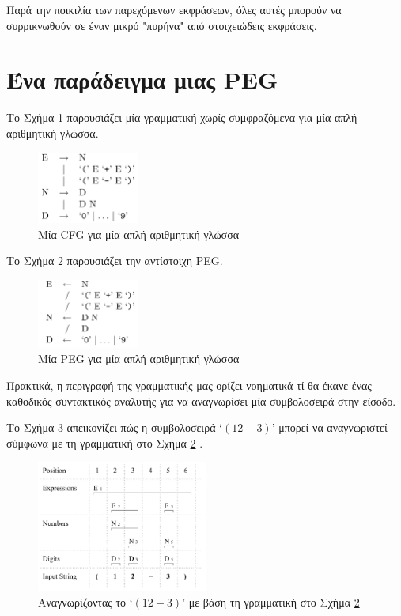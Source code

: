 \documentclass[diploma]{softlab-thesis}
\begin{document}
Παρά την ποικιλία των παρεχόμενων εκφράσεων, όλες αυτές μπορούν να συρρικνωθούν σε έναν μικρό "πυρήνα" από στοιχειώδεις εκφράσεις.

\section{Ένα παράδειγμα μιας PEG}

Το Σχήμα \ref{fig:cfg_example} παρουσιάζει μία γραμματική χωρίς συμφραζόμενα για μία απλή αριθμητική γλώσσα. 

\begin{figure}[h]
    \centering
    \includegraphics[width=0.3\textwidth]{pics/cfg_example}
    \caption{Μία CFG για μία απλή αριθμητική γλώσσα}
    \label{fig:cfg_example}
\end{figure}

Το Σχήμα \ref{fig:peg_example} παρουσιάζει την αντίστοιχη PEG.

\begin{figure}[h]
    \centering
    \includegraphics[width=0.3\textwidth]{pics/peg_example}
    \caption{Μία PEG για μία απλή αριθμητική γλώσσα}
    \label{fig:peg_example}
\end{figure}

Πρακτικά, η περιγραφή της γραμματικής μας ορίζει νοηματικά τί θα έκανε ένας καθοδικός συντακτικός αναλυτής για να αναγνωρίσει μία συμβολοσειρά στην είσοδο.

Το Σχήμα \ref{fig:peg_parse_example} απεικονίζει πώς η συμβολοσειρά `$(12-3)$' μπορεί να αναγνωριστεί σύμφωνα με τη γραμματική στο Σχήμα \ref{fig:peg_example} \cite{Ford2002c}.

\begin{figure}[h]
    \centering
    \includegraphics[width=0.5\textwidth]{pics/peg_parse_example}
	\caption{Αναγνωρίζοντας το `$(12-3)$' με βάση τη γραμματική στο Σχήμα \ref{fig:peg_example}}
    \label{fig:peg_parse_example}
\end{figure}
\end{document}
